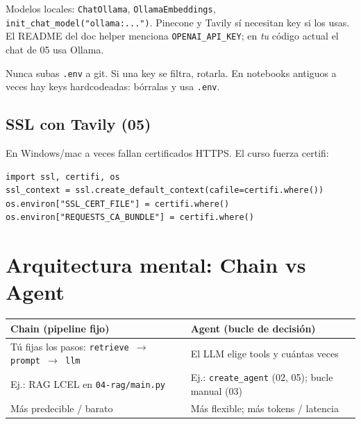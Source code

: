 \documentclass[11pt,a4paper]{article}
\begin{document}
\begin{tip}[title=Ollama no necesita key del LLM]
Modelos locales: \texttt{ChatOllama}, \texttt{OllamaEmbeddings}, \texttt{init\_chat\_model("ollama:...")}.
Pinecone y Tavily sí necesitan key si los usas.
El README del doc helper menciona \texttt{OPENAI\_API\_KEY}; en \emph{tu} código actual el chat de 05 usa Ollama.
\end{tip}

\begin{warn}
Nunca subas \texttt{.env} a git. Si una key se filtra, rotarla.
En notebooks antiguos a veces hay keys hardcodeadas: bórralas y usa \texttt{.env}.
\end{warn}

\subsection{SSL con Tavily (05)}
En Windows/mac a veces fallan certificados HTTPS. El curso fuerza certifi:

\begin{lstlisting}
import ssl, certifi, os
ssl_context = ssl.create_default_context(cafile=certifi.where())
os.environ["SSL_CERT_FILE"] = certifi.where()
os.environ["REQUESTS_CA_BUNDLE"] = certifi.where()
\end{lstlisting}

\section{Arquitectura mental: Chain vs Agent}

\begin{center}
\begin{tabular}{@{}p{7.4cm}p{7.4cm}@{}}
\toprule
\textbf{Chain (pipeline fijo)} & \textbf{Agent (bucle de decisión)} \\
\midrule
Tú fijas los pasos:
\texttt{retrieve $\to$ prompt $\to$ llm} & El LLM elige tools y cuántas veces \\
Ej.: RAG LCEL en \texttt{04-rag/main.py} & Ej.: \texttt{create\_agent} (02, 05);
bucle manual (03) \\
Más predecible / barato & Más flexible; más tokens / latencia \\
\bottomrule
\end{tabular}
\end{center}
\end{document}
